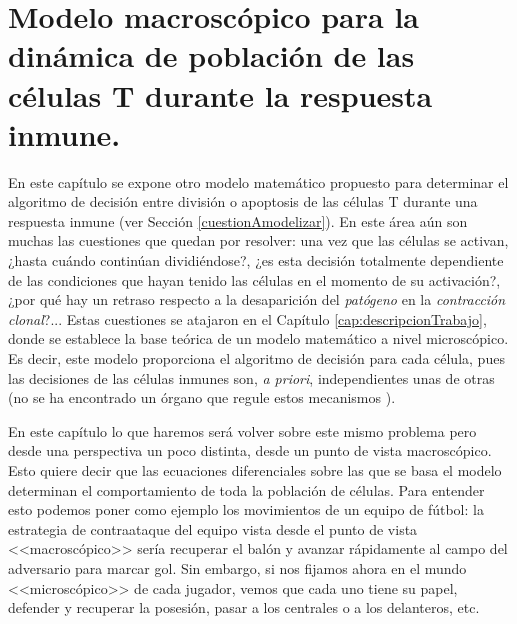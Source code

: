 
\chapter{Modelo macroscópico para la dinámica de población de las células T durante la respuesta inmune.}
\label{cap:modeloMacroscopico}

En este capítulo se expone otro modelo matemático propuesto para determinar el algoritmo de decisión entre división o apoptosis de las células T durante una respuesta inmune (ver Sección \ref{cuestionAmodelizar}). En este área aún son muchas las cuestiones que quedan por resolver: una vez que las células se activan, ¿hasta cuándo continúan dividiéndose?, ¿es esta decisión totalmente dependiente de las condiciones que hayan tenido las células en el momento de su activación?, ¿por qué hay un retraso respecto a la desaparición del \textit{patógeno} en la \textit{contracción clonal}?... Estas cuestiones se atajaron en el Capítulo \ref{cap:descripcionTrabajo}, donde se establece la base teórica de un modelo matemático a nivel microscópico. Es decir, este modelo proporciona el algoritmo de decisión para cada célula, pues las decisiones de las células inmunes son, \textit{a priori}, independientes unas de otras (no se ha encontrado un órgano que regule estos mecanismos \citep{arias2016emergent}).

En este capítulo lo que haremos será volver sobre este mismo problema pero desde una perspectiva un poco distinta, desde un punto de vista macroscópico. Esto quiere decir que las ecuaciones diferenciales sobre las que se basa el modelo determinan el comportamiento de toda la población de células. Para entender esto podemos poner como ejemplo los movimientos de un equipo de fútbol: la estrategia de contraataque del equipo vista desde el punto de vista <<macroscópico>> sería recuperar el balón y avanzar rápidamente al campo del adversario para marcar gol. Sin embargo, si nos fijamos ahora en el mundo <<microscópico>> de cada jugador, vemos que cada uno tiene su papel, defender y recuperar la posesión, pasar a los centrales o a los delanteros, etc.



